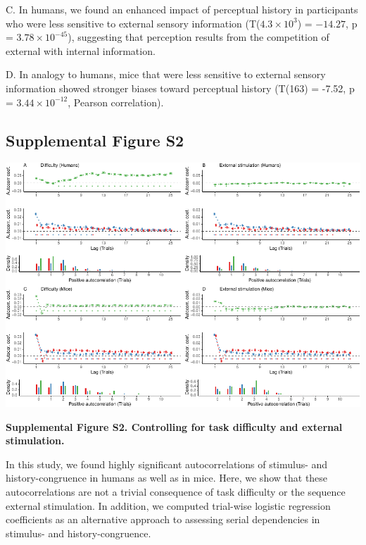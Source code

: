 \documentclass[
]{article}
\begin{document}
C. In humans, we found an enhanced impact of perceptual history in
participants who were less sensitive to external sensory information
(T(\(\ensuremath{4.3\times 10^{3}}\)) = \(-14.27\), p =
\(\ensuremath{3.78\times 10^{-45}}\)), suggesting that perception
results from the competition of external with internal information.

D. In analogy to humans, mice that were less sensitive to external
sensory information showed stronger biases toward perceptual history
(T(163) = -7.52, p = \(\ensuremath{3.44\times 10^{-12}}\), Pearson
correlation).

\newpage

\hypertarget{supplemental-figure-s2}{%
\subsection{Supplemental Figure S2}\label{supplemental-figure-s2}}

\includegraphics{modes_mouse_files/figure-latex/Supplememtal_Figure_S2-1.pdf}

\textbf{Supplemental Figure S2. Controlling for task difficulty and
external stimulation.}

In this study, we found highly significant autocorrelations of stimulus-
and history-congruence in humans as well as in mice. Here, we show that
these autocorrelations are not a trivial consequence of task difficulty
or the sequence external stimulation. In addition, we computed
trial-wise logistic regression coefficients as an alternative approach
to assessing serial dependencies in stimulus- and history-congruence.
\end{document}
